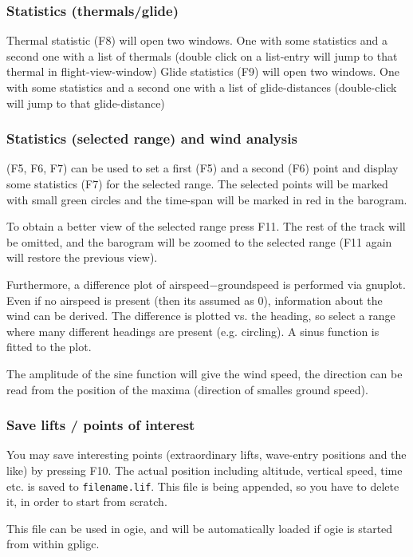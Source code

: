 \subsubsection{Statistics (thermals/glide)}
Thermal statistic (F8) will open two windows. One with some statistics and a
second one with a list of thermals (double click on a list-entry will jump
to that thermal in flight-view-window)
Glide statistics (F9) will open two windows. One with some statistics and a
second one with a list of glide-distances (double-click will jump to that
glide-distance)

\subsubsection{Statistics (selected range) and wind analysis}
(F5, F6, F7) can be used to set a first (F5) and a second (F6) point and
display some statistics (F7) for the selected range. The selected points will be
marked with small green circles and the time-span will be marked in red in the barogram.

To obtain a better view of the selected range press F11. The rest of the track will be omitted, and the
barogram will be zoomed to the selected range (F11 again will restore the previous view).

Furthermore, a difference plot of airspeed$-$groundspeed is performed via gnuplot. Even if no airspeed is present
(then its assumed as 0), information about the wind can be derived. The difference is plotted vs. the heading,
so select a range where many different headings are present (e.g. circling). A sinus function is fitted to the plot.

The amplitude of the sine function will give the wind speed, the direction can be read from the position of the maxima (direction of smalles ground speed).



\subsubsection{Save lifts / points of interest}
You may save interesting points (extraordinary lifts, wave-entry positions and the like) by pressing F10.
The actual position including altitude, vertical speed, time etc. is saved to \texttt{filename.lif}.
This file is being appended, so you have to delete it, in order to start from scratch.

This file can be used in ogie, and will be automatically loaded if ogie is started from within gpligc.


